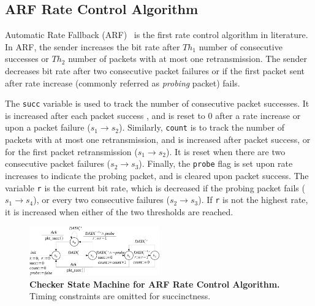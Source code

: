 \subsection{ARF Rate Control Algorithm}
\label{subsec:arf}


Automatic Rate Fallback (ARF)~\cite{kamerman1997wavelan} is the first rate
control algorithm in literature. In ARF, the sender increases the bit rate after
$Th_1$ number of consecutive successes or $Th_2$ number of packets with at most
one retransmission. The sender decreases bit rate after two consecutive packet
failures or if the first packet sent after rate increase (commonly referred as
\textit{probing} packet) fails.


The \texttt{succ} variable is used to track the number of consecutive packet
successes. It is increased after each packet success , and is reset to 0 after a
rate increase or upon a packet failure ($s_1\rightarrow s_2$).  Similarly,
\texttt{count} is to track the number of packets with at most one
retransmission, and is increased after packet success, or for the first packet
retransmission ($s_1\rightarrow s_2$). It is reset when there are two
consecutive packet failures ($s_2\rightarrow s_3$). Finally, the \texttt{probe}
flag is set upon rate increases to indicate the probing packet, and is cleared
upon packet success. The variable \texttt{r} is the current bit rate, which is
decreased if the probing packet fails ($s_1\rightarrow s_4$), or every two
consecutive failures ($s_2\rightarrow s_3$). If \texttt{r} is not the highest
rate, it is increased when either of the two thresholds are reached.

\begin{figure}[t!]
  \centering
  \includegraphics[width=0.50\textwidth]{./figures/arf_sm.pdf}
  \caption{\textbf{Checker State Machine for ARF Rate Control Algorithm.} Timing
  constraints are omitted for succinctness.}
  \label{fig:arf_sm}
\end{figure}

